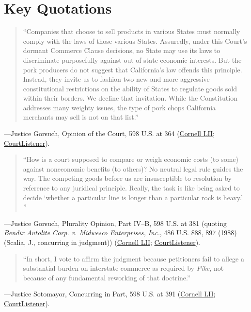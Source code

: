 \documentclass[12pt]{article}
\begin{document}
\section{Key Quotations}
\begin{quote}
``Companies that choose to sell products in various States must normally comply with the laws of those various States. Assuredly, under this Court's dormant Commerce Clause decisions, no State may use its laws to discriminate purposefully against out-of-state economic interests. But the pork producers do not suggest that California's law offends this principle. Instead, they invite us to fashion two new and more aggressive constitutional restrictions on the ability of States to regulate goods sold within their borders. We decline that invitation. While the Constitution addresses many weighty issues, the type of pork chops California merchants may sell is not on that list.''
\end{quote}
---Justice Gorsuch, Opinion of the Court, 598 U.S. at 364 (\href{https://www.law.cornell.edu/supremecourt/text/21-468}{Cornell LII}; \href{https://www.courtlistener.com/opinion/10049695/national-pork-producers-council-v-ross/}{CourtListener}).

\begin{quote}
``How is a court supposed to compare or weigh economic costs (to some) against noneconomic benefits (to others)? No neutral legal rule guides the way. The competing goods before us are insusceptible to resolution by reference to any juridical principle. Really, the task is like being asked to decide `whether a particular line is longer than a particular rock is heavy.' ''
\end{quote}
---Justice Gorsuch, Plurality Opinion, Part IV--B, 598 U.S. at 381 (quoting \textit{Bendix Autolite Corp. v. Midwesco Enterprises, Inc.}, 486 U.S. 888, 897 (1988) (Scalia, J., concurring in judgment)) (\href{https://www.law.cornell.edu/supremecourt/text/21-468}{Cornell LII}; \href{https://www.courtlistener.com/opinion/10049695/national-pork-producers-council-v-ross/}{CourtListener}).

\begin{quote}
``In short, I vote to affirm the judgment because petitioners fail to allege a substantial burden on interstate commerce as required by \textit{Pike}, not because of any fundamental reworking of that doctrine.''
\end{quote}
---Justice Sotomayor, Concurring in Part, 598 U.S. at 391 (\href{https://www.law.cornell.edu/supremecourt/text/21-468}{Cornell LII}; \href{https://www.courtlistener.com/opinion/10049695/national-pork-producers-council-v-ross/}{CourtListener}).
\end{document}
